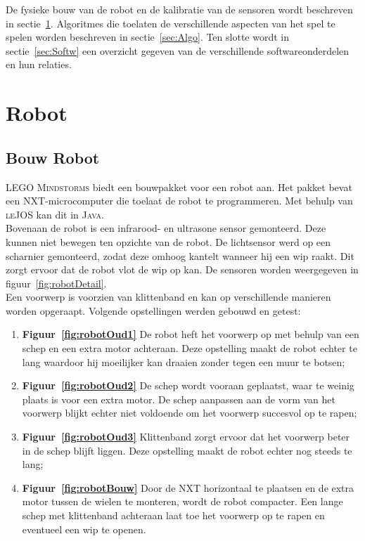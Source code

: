 \documentclass[eind]{penoverslag}
\begin{document}
De fysieke bouw van de robot en de kalibratie van de sensoren wordt beschreven in sectie~\ref{sec:Robot}. Algoritmes die toelaten de verschillende aspecten van het spel te spelen worden beschreven in sectie~\ref{sec:Algo}. Ten slotte wordt in sectie~\ref{sec:Softw} een overzicht gegeven van de verschillende softwareonderdelen en hun relaties.

\section{Robot}
\label{sec:Robot}

\subsection{Bouw Robot}
\label{ssec:Bouw}
\textsc{LEGO Mindstorms} biedt een bouwpakket voor een robot aan. Het pakket bevat een \textsc{NXT}-microcomputer die toelaat de robot te programmeren. Met behulp van \textsc{leJOS} kan dit in \textsc{Java}.\\

Bovenaan de robot is een infrarood- en ultrasone sensor gemonteerd. Deze kunnen niet bewegen ten opzichte van de robot. De lichtsensor werd op een scharnier gemonteerd, zodat deze omhoog kantelt wanneer hij een wip raakt. Dit zorgt ervoor dat de robot vlot de wip op kan. De sensoren worden weergegeven in figuur~\ref{fig:robotDetail}.\\

Een voorwerp is voorzien van klittenband en kan op verschillende manieren worden opgeraapt. Volgende opstellingen werden gebouwd en getest:

\begin{enumerate}
\item \textbf{Figuur~\ref{fig:robotOud1}} De robot heft het voorwerp op met behulp van een schep en een extra motor achteraan. Deze opstelling maakt de robot echter te lang waardoor hij moeilijker kan draaien zonder tegen een muur te botsen;
\item \textbf{Figuur~\ref{fig:robotOud2}} De schep wordt vooraan geplaatst, waar te weinig plaats is voor een extra motor. De schep aanpassen aan de vorm van het voorwerp blijkt echter niet voldoende om het voorwerp succesvol op te rapen;
\item \textbf{Figuur~\ref{fig:robotOud3}} Klittenband zorgt ervoor dat het voorwerp beter in de schep blijft liggen. Deze opstelling maakt de robot echter nog steeds te lang;
\item \textbf{Figuur~\ref{fig:robotBouw}} Door de \textsc{NXT} horizontaal te plaatsen en de extra motor tussen de wielen te monteren, wordt de robot compacter. Een lange schep met klittenband achteraan laat toe het voorwerp op te rapen en eventueel een wip te openen.
\end{enumerate}
\end{document}
